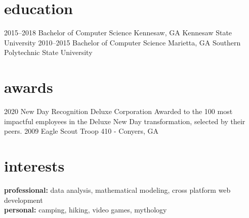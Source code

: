 \documentclass[]{friggeri-cv} %
\begin{document}
\section{education}

\begin{entrylist}


\entry
{2015--2018}
{Bachelor {\normalfont of Computer Science}}
{Kennesaw, GA}
{Kennesaw State University}
\entry
{2010--2015}
{Bachelor {\normalfont of Computer Science}}
{Marietta, GA}
{Southern Polytechnic State University}

\end{entrylist}


\section{awards}

\begin{entrylist}


\entry
{2020}
{New Day Recognition}
{Deluxe Corporation}
{Awarded to the 100 most impactful employees in the Deluxe New Day transformation, selected by their peers.}
\entry
{2009}
{Eagle Scout}
{Troop 410 - Conyers, GA}
{}

\end{entrylist}



\section{interests}

\textbf{professional:} data analysis, mathematical modeling, cross platform web development   \\
\textbf{personal:} camping, hiking, video games, mythology
\end{document}
